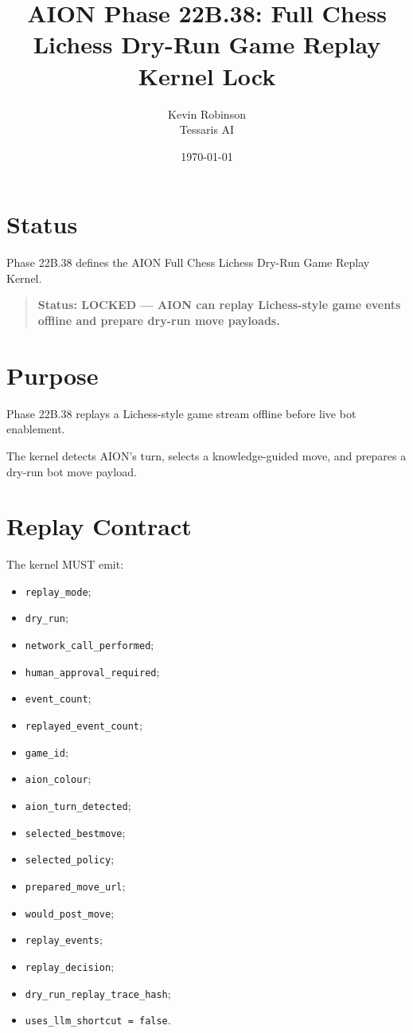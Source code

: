 \documentclass[11pt,a4paper]{article}
\title{\textbf{AION Phase 22B.38: Full Chess Lichess Dry-Run Game Replay Kernel Lock}}
\author{Kevin Robinson\\Tessaris AI}
\date{\today}
\begin{document}
\maketitle

\section{Status}

Phase 22B.38 defines the AION Full Chess Lichess Dry-Run Game Replay Kernel.

\begin{quote}
\textbf{Status: LOCKED --- AION can replay Lichess-style game events offline and prepare dry-run move payloads.}
\end{quote}

\section{Purpose}

Phase 22B.38 replays a Lichess-style game stream offline before live bot enablement.

The kernel detects AION's turn, selects a knowledge-guided move, and prepares a dry-run bot move payload.

\section{Replay Contract}

The kernel MUST emit:

\begin{itemize}
  \item \texttt{replay\_mode};
  \item \texttt{dry\_run};
  \item \texttt{network\_call\_performed};
  \item \texttt{human\_approval\_required};
  \item \texttt{event\_count};
  \item \texttt{replayed\_event\_count};
  \item \texttt{game\_id};
  \item \texttt{aion\_colour};
  \item \texttt{aion\_turn\_detected};
  \item \texttt{selected\_bestmove};
  \item \texttt{selected\_policy};
  \item \texttt{prepared\_move\_url};
  \item \texttt{would\_post\_move};
  \item \texttt{replay\_events};
  \item \texttt{replay\_decision};
  \item \texttt{dry\_run\_replay\_trace\_hash};
  \item \texttt{uses\_llm\_shortcut = false}.
\end{itemize}
\end{document}

